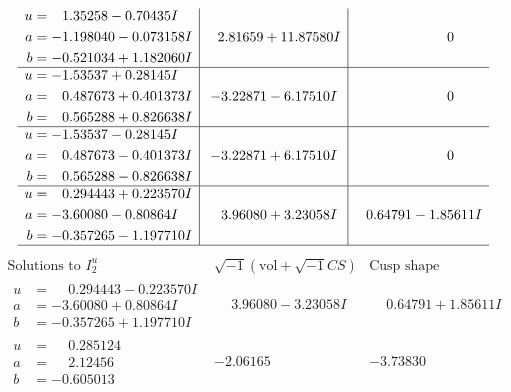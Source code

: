 \documentclass[1p]{elsarticle_modified}
\theoremstyle{definition}
\newcommand{\I}{\sqrt{-1}}
\begin{document}
$$\begin{array}{c|c|c}
\begin{aligned}
u &= \phantom{-}1.35258 - 0.70435 I \\
a &= -1.198040 - 0.073158 I \\
b &= -0.521034 + 1.182060 I\end{aligned}
 & \phantom{-}2.81659 + 11.87580 I & \phantom{-0.000000 } 0 \\ \hline\begin{aligned}
u &= -1.53537 + 0.28145 I \\
a &= \phantom{-}0.487673 + 0.401373 I \\
b &= \phantom{-}0.565288 + 0.826638 I\end{aligned}
 & -3.22871 - 6.17510 I & \phantom{-0.000000 } 0 \\ \hline\begin{aligned}
u &= -1.53537 - 0.28145 I \\
a &= \phantom{-}0.487673 - 0.401373 I \\
b &= \phantom{-}0.565288 - 0.826638 I\end{aligned}
 & -3.22871 + 6.17510 I & \phantom{-0.000000 } 0 \\ \hline\begin{aligned}
u &= \phantom{-}0.294443 + 0.223570 I \\
a &= -3.60080 - 0.80864 I \\
b &= -0.357265 - 1.197710 I\end{aligned}
 & \phantom{-}3.96080 + 3.23058 I & \phantom{-}0.64791 - 1.85611 I\\
 \hline 
 \end{array}$$\newpage$$\begin{array}{c|c|c}  
\text{Solutions to }I^u_{2}& \I (\text{vol} + \sqrt{-1}CS) & \text{Cusp shape}\\
 \hline 
\begin{aligned}
u &= \phantom{-}0.294443 - 0.223570 I \\
a &= -3.60080 + 0.80864 I \\
b &= -0.357265 + 1.197710 I\end{aligned}
 & \phantom{-}3.96080 - 3.23058 I & \phantom{-}0.64791 + 1.85611 I \\ \hline\begin{aligned}
u &= \phantom{-}0.285124\phantom{ +0.000000I} \\
a &= \phantom{-}2.12456\phantom{ +0.000000I} \\
b &= -0.605013\phantom{ +0.000000I}\end{aligned}
 & -2.06165\phantom{ +0.000000I} & -3.73830\phantom{ +0.000000I} \\ \hline\begin{aligned}

\end{aligned}
\end{array}$$
\end{document}
